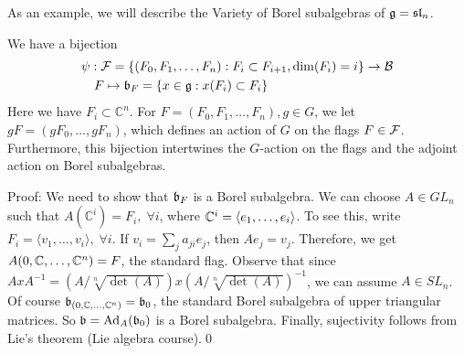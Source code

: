 As an example, we will describe the Variety of Borel subalgebras of $\mathfrak{g}=\mathfrak{sl}_n$. 
\begin{dang}
    \begin{lemma}
    We have a bijection 
\begin{equation}
    \begin{split}
        &\psi:\mathcal{F}=\{(F_0,F_1,\dots, F_n):F_i\subset F_{i+1},\dim(F_i)=i\}\to\mathcal{B}\\
        &\quad F\mapsto \mathfrak{b}_F=\{x\in\mathfrak{g}:x(F_i)\subset F_i\}
    \end{split}
\end{equation}
Here we have $F_i\subset \mathbb{C}^n$. 
For $F = (F_0,F_1,\dots, F_n),g\in G$, we let $gF=(gF_0,\dots, gF_n)$, which defines an action of $G$ 
on the flags $F\in\mathcal{F}$. Furthermore, this bijection 
intertwines the $G$-action on the flags and the adjoint action on Borel subalgebras.
\end{lemma}
\end{dang}
Proof: We need to show that $\mathfrak{b}_F$ is a Borel subalgebra. We can choose $A\in GL_n$ such 
that $A(\mathbb{C}^i)=F_i,\;\forall i$, where $\mathbb{C}^i = \langle e_1,\dots, e_i\rangle$. To see this, write 
$F_i = \langle v_1,\dots, v_i\rangle,\;\forall i$. If $v_i = \sum_j a_{ji}e_j$, then $Ae_j=v_j$. 
Therefore, we get $A(0,\mathbb{C},\dots,\mathbb{C}^n)=F$, the standard flag. Observe that since 
$AxA^{-1}=(A/\sqrt[n]{\det(A)})x(A/\sqrt[n]{\det(A)})^{-1}$, we 
can assume $A\in SL_n$. Of course $\mathfrak{b}_{(0,\mathbb{C},\dots,\mathbb{C}^n )}=\mathfrak{b}_0$, the standard Borel subalgebra of upper triangular matrices. 
So $\mathfrak{b}=\text{Ad}_A(\mathfrak{b}_0)$ is a Borel subalgebra. Finally, sujectivity follows from Lie's theorem (Lie algebra course).\qed

